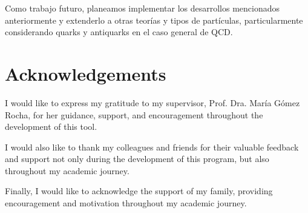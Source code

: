\documentclass[11pt,a4paper,twoside,pdf]{article}
\numberwithin{equation}{section}
\begin{document}
Como trabajo futuro, planeamos implementar los desarrollos mencionados anteriormente 
y extenderlo a otras teor\'ias y tipos de part\'iculas, particularmente
considerando quarks y antiquarks en el caso general de QCD.

\section*{Acknowledgements}

I would like to express my gratitude to my supervisor, Prof. Dra. María Gómez Rocha,
for her guidance, support, and encouragement throughout the development of this tool.

I would also like to thank my colleagues and friends for their valuable feedback and
support not only during the development of this program, but also throughout my academic journey.

Finally, I would like to acknowledge the support of my family, providing encouragement 
and motivation throughout my academic journey. 



\newpage
\appendix

\newpage

\end{document}
